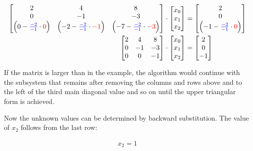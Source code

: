 \begin{align}
\nonumber
\begin{bmatrix}
	2&
	4&
	8\\
	0&
	-1&
	-3\\
	\left(0 - \textcolor{blue}{\frac{-2}{-1}} \cdot \textcolor{red}{0} \right)&
	\left(-2 - \textcolor{blue}{\frac{-2}{-1}} \cdot \textcolor{red}{-1} \right)&
	\left(-7 - \textcolor{blue}{\frac{-2}{-1}} \cdot \textcolor{red}{-3} \right)\\
\end{bmatrix}
&\cdot
\begin{bmatrix}
	x_0\\
	x_1\\
	x_2\\
\end{bmatrix}
=
\begin{bmatrix}
	2\\
	0\\
	\left(-1 - \textcolor{blue}{\frac{-2}{-1}} \cdot \textcolor{red}{0} \right)\\
\end{bmatrix}
\\
\label{eq:gauss3x3triangular}
\begin{bmatrix}
2&4&8\\
0&-1&-3\\
0&0&-1\\
\end{bmatrix}
&\cdot
\begin{bmatrix}
x_0\\
x_1\\
x_2\\
\end{bmatrix}
=
\begin{bmatrix}
2\\
0\\
-1\\
\end{bmatrix}
\end{align}

If the matrix is larger than in the example, the algorithm would continue with the subsystem that remains after removing the columns and rows  above and to the left of the third main diagonal value and so on until the upper triangular form is achieved.

Now the unknown values can be determined by backward substitution.
The value of $x_2$ follows from the last row: 


\begin{align*}
 x_2 = 1
\end{align*}

